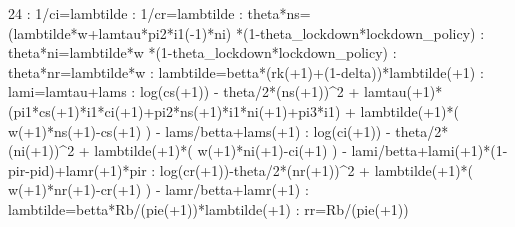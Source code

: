 \documentclass{article}%
\begin{document}
24   :  1/ci=lambtilde\newline%
   :  1/cr=lambtilde\newline%
   :  theta*ns=(lambtilde*w+lamtau*pi2*i1({-}1)*ni) *(1{-}theta\_lockdown*lockdown\_policy)\newline%
   :  theta*ni=lambtilde*w *(1{-}theta\_lockdown*lockdown\_policy)\newline%
   :  theta*nr=lambtilde*w\newline%
   :  lambtilde=betta*(rk(+1)+(1{-}delta))*lambtilde(+1)\newline%
   :  lami=lamtau+lams\newline%
   :  log(cs(+1)) {-} theta/2*(ns(+1))\^{}2 + lamtau(+1)*(pi1*cs(+1)*i1*ci(+1)+pi2*ns(+1)*i1*ni(+1)+pi3*i1) + lambtilde(+1)*( w(+1)*ns(+1){-}cs(+1) ) {-} lams/betta+lams(+1)\newline%
   :  log(ci(+1)) {-} theta/2*(ni(+1))\^{}2 + lambtilde(+1)*( w(+1)*ni(+1){-}ci(+1) ) {-} lami/betta+lami(+1)*(1{-}pir{-}pid)+lamr(+1)*pir\newline%
   :  log(cr(+1)){-}theta/2*(nr(+1))\^{}2 + lambtilde(+1)*( w(+1)*nr(+1){-}cr(+1) ) {-} lamr/betta+lamr(+1)\newline%
   :  lambtilde=betta*Rb/(pie(+1))*lambtilde(+1)\newline%
   :  rr=Rb/(pie(+1))\newline%
\newline%
\end{document}
